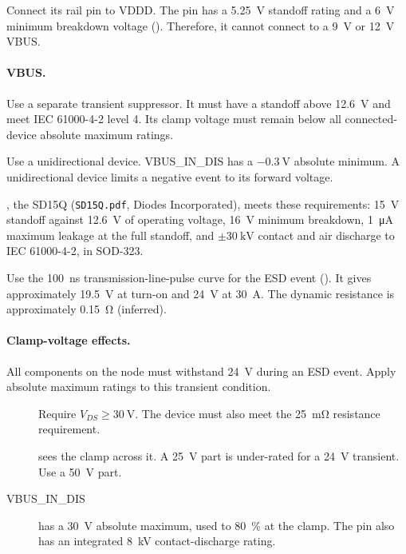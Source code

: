 Connect its rail pin to VDDD. The pin has a \SI{5.25}{\volt} standoff rating
and a \SI{6}{\volt} minimum breakdown voltage (). Therefore,
it cannot connect to a \SI{9}{\volt} or \SI{12}{\volt} VBUS.

\paragraph{VBUS.} Use a separate transient suppressor. It must have a standoff
above \SI{12.6}{\volt} and meet IEC 61000-4-2 level 4. Its clamp voltage must
remain below all connected-device absolute maximum ratings.

Use a unidirectional device. VBUS\_IN\_DIS has a
$-\SI{0.3}{\volt}$ absolute minimum. A unidirectional device limits a negative
event to its forward voltage.

, the SD15Q (\texttt{SD15Q.pdf}, Diodes Incorporated), meets these requirements:
\SI{15}{\volt} standoff against \SI{12.6}{\volt} of operating voltage,
\SI{16}{\volt} minimum breakdown, \SI{1}{\micro\ampere} maximum leakage at the
full standoff, and $\pm\SI{30}{\kilo\volt}$ contact and air discharge to
IEC 61000-4-2, in SOD-323.

Use the \SI{100}{\nano\second} transmission-line-pulse curve for the ESD event
(). It gives approximately \SI{19.5}{\volt} at turn-on and
\SI{24}{\volt} at \SI{30}{\ampere}. The dynamic resistance is approximately
\SI{0.15}{\ohm} (inferred).

\paragraph{Clamp-voltage effects.} All components on the node must withstand
\SI{24}{\volt} during an ESD event. Apply absolute maximum ratings to this
transient condition.
\begin{description}
  \item[] Require $V_{DS}\geq\SI{30}{\volt}$. The device must also
    meet the \SI{25}{\milli\ohm} resistance requirement.
  \item[] sees the clamp across it. A \SI{25}{\volt} part is
    under-rated for a \SI{24}{\volt} transient. Use a \SI{50}{\volt} part.
  \item[VBUS\_IN\_DIS] has a \SI{30}{\volt} absolute maximum, used to
    \SI{80}{\percent} at the clamp. The pin also has an integrated
    \SI{8}{\kilo\volt} contact-discharge rating.
\end{description}

